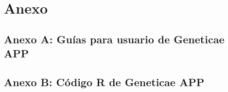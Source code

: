 

\chapter{Anexo}
\section{Anexo A: Guías para usuario de Geneticae APP}

\section{Anexo B: Código R de Geneticae APP}
